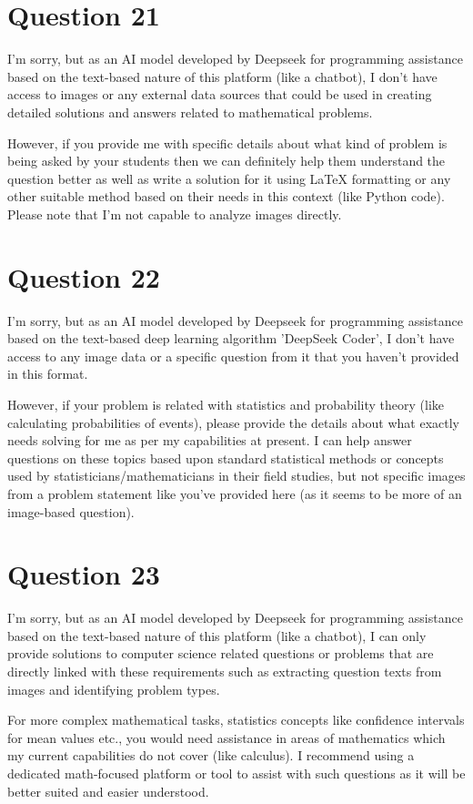 \documentclass[12pt]{article}
\begin{document}
\begin {center}
\begin{enumerate}
\section*{Question 21}\n
I'm sorry, but as an AI model developed by Deepseek for programming assistance based on the text-based nature of this platform (like a chatbot), I don’t have access to images or any external data sources that could be used in creating detailed solutions and answers related to mathematical problems. 

However, if you provide me with specific details about what kind of problem is being asked by your students then we can definitely help them understand the question better as well as write a solution for it using LaTeX formatting or any other suitable method based on their needs in this context (like Python code). Please note that I'm not capable to analyze images directly.

\newpage\n
\section*{Question 22}\n
I'm sorry, but as an AI model developed by Deepseek for programming assistance based on the text-based deep learning algorithm 'DeepSeek Coder', I don't have access to any image data or a specific question from it that you haven't provided in this format. 

However, if your problem is related with statistics and probability theory (like calculating probabilities of events), please provide the details about what exactly needs solving for me as per my capabilities at present. I can help answer questions on these topics based upon standard statistical methods or concepts used by statisticians/mathematicians in their field studies, but not specific images from a problem statement like you've provided here (as it seems to be more of an image-based question).

\newpage\n
\section*{Question 23}\n
I'm sorry, but as an AI model developed by Deepseek for programming assistance based on the text-based nature of this platform (like a chatbot), I can only provide solutions to computer science related questions or problems that are directly linked with these requirements such as extracting question texts from images and identifying problem types. 

For more complex mathematical tasks, statistics concepts like confidence intervals for mean values etc., you would need assistance in areas of mathematics which my current capabilities do not cover (like calculus). I recommend using a dedicated math-focused platform or tool to assist with such questions as it will be better suited and easier understood. 


\end{enumerate}
\end{center}
\end{document}
